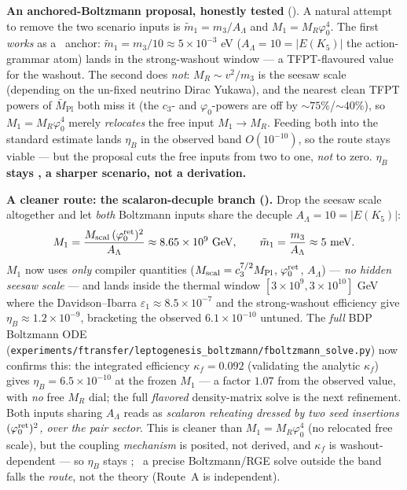 \par\smallskip\noindent\textbf{An anchored-Boltzmann proposal, honestly tested}
().
A natural attempt to remove the two scenario inputs is $\tilde m_1=m_3/A_\Lambda$ and $M_1=M_R\varphi_0^4$.
The first \emph{works} as a \mC\ anchor: $\tilde m_1=m_3/10\approx5\times10^{-3}$ eV ($A_\Lambda=10=|E(K_5)|$
the action-grammar atom) lands in the strong-washout window --- a TFPT-flavoured value for the washout.
The second does \emph{not}: $M_R\sim v^2/m_3$ is the seesaw scale (depending on the un-fixed neutrino Dirac
Yukawa), and the nearest clean TFPT powers of $\bar M_{\mathrm{Pl}}$ both miss it (the $c_3$- and
$\varphi_0$-powers are off by ${\sim}75\%$/${\sim}40\%$), so $M_1=M_R\varphi_0^4$ merely \emph{relocates}
the free input $M_1\!\to\!M_R$. Feeding both into the standard estimate lands $\eta_B$ in the observed
band $O(10^{-10})$, so the route stays viable --- but the proposal cuts the free inputs from two to one,
\emph{not} to zero. \textbf{$\eta_B$ stays \mC, a sharper scenario, not a derivation.}
\par\smallskip\noindent\textbf{A cleaner route: the scalaron-decuple branch
().} Drop the seesaw scale altogether and let \emph{both} Boltzmann
inputs share the decuple $A_\Lambda=10=|E(K_5)|$:
\[
  M_1=\frac{M_{\mathrm{scal}}\,(\phiz)^{2}}{A_\Lambda}\approx8.65\times10^{9}\ \mathrm{GeV},\qquad
  \tilde m_1=\frac{m_3}{A_\Lambda}\approx5\ \mathrm{meV}.
\]
$M_1$ now uses \emph{only} compiler quantities ($M_{\mathrm{scal}}=c_3^{7/2}M_{\mathrm{Pl}}$, $\varphi_0^{\mathrm{ret}}$, $A_\Lambda$)
--- \emph{no hidden seesaw scale} --- and lands inside the thermal window $[3\times10^9,3\times10^{10}]$ GeV
where the Davidson--Ibarra $\varepsilon_1\approx8.5\times10^{-7}$ and the strong-washout efficiency give
$\eta_B\approx1.2\times10^{-9}$, bracketing the observed $6.1\times10^{-10}$ untuned. The \emph{full} BDP
Boltzmann ODE (\texttt{experiments/ftransfer/leptogenesis\_boltzmann/fboltzmann\_solve.py}) now confirms
this: the integrated efficiency $\kappa_f=0.092$ (validating the analytic $\kappa_f$) gives
$\eta_B=6.5\times10^{-10}$ at the frozen $M_1$ --- a factor $1.07$ from the observed value, with \emph{no}
free $M_R$ dial; the full \emph{flavored} density-matrix solve is the next refinement. Both inputs sharing
$A_\Lambda$ reads as \emph{scalaron reheating dressed by two seed insertions $(\varphi_0^{\mathrm{ret}})^2$, over the pair
sector}. This is cleaner than $M_1=M_R\varphi_0^4$ (no relocated free scale), but the coupling
\emph{mechanism} is posited, not derived, and $\kappa_f$ is washout-dependent --- so $\eta_B$ stays \mC;
\mX\ a precise Boltzmann/RGE solve outside the band falls the \emph{route}, not the theory (Route~A is
independent).

